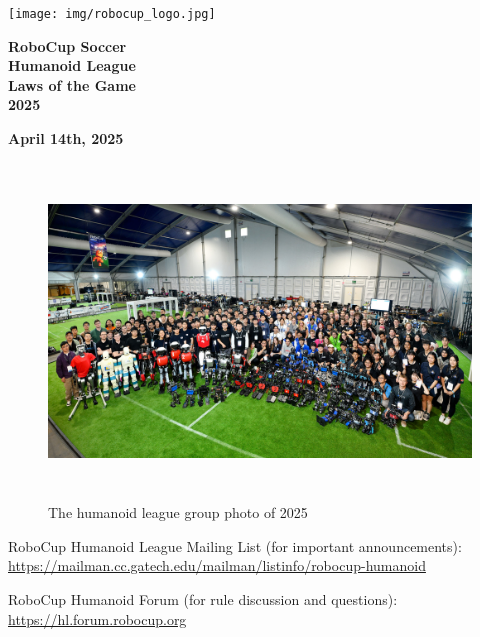 \documentclass[a4paper]{article}
\title{}
\author{\rulesauthor}
\date{2022-06-11}
\begin{document}
    \sffamily

    \begin{center}
        \texttt{[image: img/robocup\_logo.jpg]}

        {\Huge \bfseries
        RoboCup Soccer
        \\
        Humanoid League
        \\
        Laws of the Game
        \\ \vspace{0.5cm}
        2025}

        \bigskip

        {\bfseries April 14th, 2025}
    \end{center}

    \begin{figure}[!h]
        \centering
        \includegraphics[height=3.5in]{img/cover_2025.jpg}
        \captionsetup{labelformat=empty}
\caption{The humanoid league group photo of 2025}
    \end{figure}


    \bigskip
    RoboCup Humanoid League Mailing List (for important announcements):\\
    \url{https://mailman.cc.gatech.edu/mailman/listinfo/robocup-humanoid}

    \medskip
    RoboCup Humanoid Forum (for rule discussion and questions):\\
    \url{https://hl.forum.robocup.org}
\end{document}
